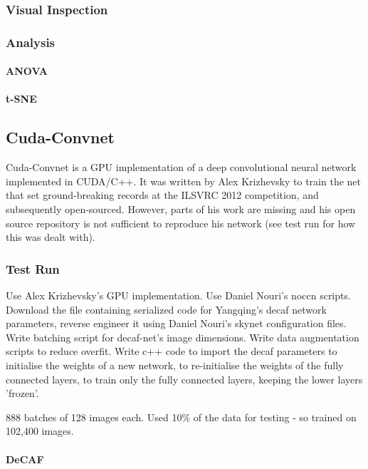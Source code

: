 \documentclass[a4paper,11pt]{article}
\begin{document}
\subsubsection{Visual Inspection}
\subsubsection{Analysis}
\paragraph{ANOVA}
\paragraph{t-SNE}

\subsection{Cuda-Convnet}

Cuda-Convnet is a GPU implementation of a deep convolutional neural network implemented in CUDA/C++. It was written by Alex Krizhevsky to train the net that set ground-breaking records at the ILSVRC 2012 competition, and subsequently open-sourced. However, parts of his work are missing and his open source repository is not sufficient to reproduce his network (see test run for how this was dealt with).

\subsubsection{Test Run}

Use Alex Krizhevsky's GPU implementation. Use Daniel Nouri's noccn scripts. Download the file containing serialized code for Yangqing's decaf\cite{decaf} network parameters, reverse engineer it using Daniel Nouri's skynet configuration files. Write batching script for decaf-net's image dimensions. Write data augmentation scripts to reduce overfit.  Write c++ code to import the decaf parameters to initialise the weights of a new network, to re-initialise the weights of the fully connected layers, to train only the fully connected layers, keeping the lower layers 'frozen'.

888 batches of 128 images each. Used 10\% of the data for testing - so trained on 102,400 images.

\paragraph{DeCAF}
\end{document}
